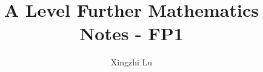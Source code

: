 \documentclass[oneside,fleqn,11pt]{book}
\title{A Level Further Mathematics Notes - FP1}
\author{Xingzhi Lu}
\date{}
\begin{document}
\maketitle
\everymath{\displaystyle}
\tableofcontents


\end{document}

